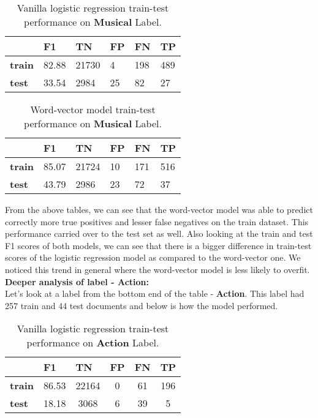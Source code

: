 \begin{table}[htbp]
\centering
\begin{tabular}{l|l|l|l|l|l|}
 & \textbf{F1} & \textbf{TN} & \textbf{FP} & \textbf{FN} & \textbf{TP} \\ \hline
\textbf{train} & 82.88 & 21730 & 4 & 198 & 489 \\
\textbf{test} & 33.54 & 2984 & 25 & 82 & 27
\end{tabular}
\caption{\label{tab:widgets}Vanilla logistic regression train-test performance on \textbf{Musical} Label.}
\end{table}

\begin{table}[htbp]
\centering
\begin{tabular}{l|l|l|l|l|l|}
 & \textbf{F1} & \textbf{TN} & \textbf{FP} & \textbf{FN} & \textbf{TP} \\ \hline
\textbf{train} & 85.07 & 21724 & 10 & 171 & 516 \\
\textbf{test} & 43.79 & 2986 & 23 & 72 & 37
\end{tabular}
\caption{\label{tab:widgets}Word-vector model train-test performance on \textbf{Musical} Label.}
\end{table}

From the above tables, we can see that the word-vector model was able to predict correctly more true positives and lesser false negatives on the train dataset. This performance carried over to the test set as well. Also looking at the train and test F1 scores of both models, we can see that there is a bigger difference in train-test scores of the logistic regression model as compared to the word-vector one. We noticed this trend in general where the word-vector model is less likely to overfit.\\

\noindent \textbf{Deeper analysis of label - Action:}\\

Let's look at a label from the bottom end of the table - \textbf{Action}. This label had 257 train and 44 test documents and below is how the model performed.

\begin{table}[htbp]
\centering
\begin{tabular}{l|c|c|c|c|c|}
 & \multicolumn{1}{l|}{\textbf{F1}} & \multicolumn{1}{l|}{\textbf{TN}} & \multicolumn{1}{l|}{\textbf{FP}} & \multicolumn{1}{l|}{\textbf{FN}} & \multicolumn{1}{l|}{\textbf{TP}} \\ \hline
\textbf{train} & 86.53 & 22164 & 0 & 61 & 196 \\
\textbf{test} & 18.18 & 3068 & 6 & 39 & 5
\end{tabular}
\caption{\label{tab:widgets}Vanilla logistic regression train-test performance on \textbf{Action} Label.}
\end{table}


